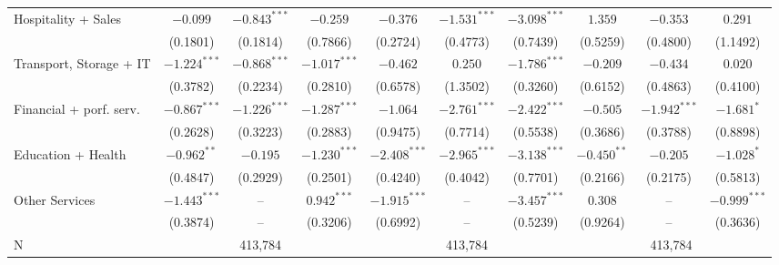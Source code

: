 \begin{tabular}{l|ccc|ccc|ccc|}
Hospitality + Sales      &        $-0.099$ &  $-0.843^{***}$ &        $-0.259$ &        $-0.376$ &  $-1.531^{***}$ &  $-3.098^{***}$ &         $1.359$ &        $-0.353$ &         $0.291$ \\
                         &        (0.1801) &        (0.1814) &        (0.7866) &        (0.2724) &        (0.4773) &        (0.7439) &        (0.5259) &        (0.4800) &        (1.1492) \\
Transport, Storage + IT  &  $-1.224^{***}$ &  $-0.868^{***}$ &  $-1.017^{***}$ &        $-0.462$ &         $0.250$ &  $-1.786^{***}$ &        $-0.209$ &        $-0.434$ &         $0.020$ \\
                         &        (0.3782) &        (0.2234) &        (0.2810) &        (0.6578) &        (1.3502) &        (0.3260) &        (0.6152) &        (0.4863) &        (0.4100) \\
Financial + porf. serv.  &  $-0.867^{***}$ &  $-1.226^{***}$ &  $-1.287^{***}$ &        $-1.064$ &  $-2.761^{***}$ &  $-2.422^{***}$ &        $-0.505$ &  $-1.942^{***}$ &      $-1.681^*$ \\
                         &        (0.2628) &        (0.3223) &        (0.2883) &        (0.9475) &        (0.7714) &        (0.5538) &        (0.3686) &        (0.3788) &        (0.8898) \\
Education + Health       &   $-0.962^{**}$ &        $-0.195$ &  $-1.230^{***}$ &  $-2.408^{***}$ &  $-2.965^{***}$ &  $-3.138^{***}$ &   $-0.450^{**}$ &        $-0.205$ &      $-1.028^*$ \\
                         &        (0.4847) &        (0.2929) &        (0.2501) &        (0.4240) &        (0.4042) &        (0.7701) &        (0.2166) &        (0.2175) &        (0.5813) \\
Other Services           &  $-1.443^{***}$ &              -- &   $0.942^{***}$ &  $-1.915^{***}$ &              -- &  $-3.457^{***}$ &         $0.308$ &              -- &  $-0.999^{***}$ \\
                         &        (0.3874) &              -- &        (0.3206) &        (0.6992) &              -- &        (0.5239) &        (0.9264) &              -- &        (0.3636) \\
\midrule
N                        & \multicolumn{3}{c}{413,784} & \multicolumn{3}{c}{413,784} &   \multicolumn{3}{c}{413,784} \\
\bottomrule
\end{tabular}
